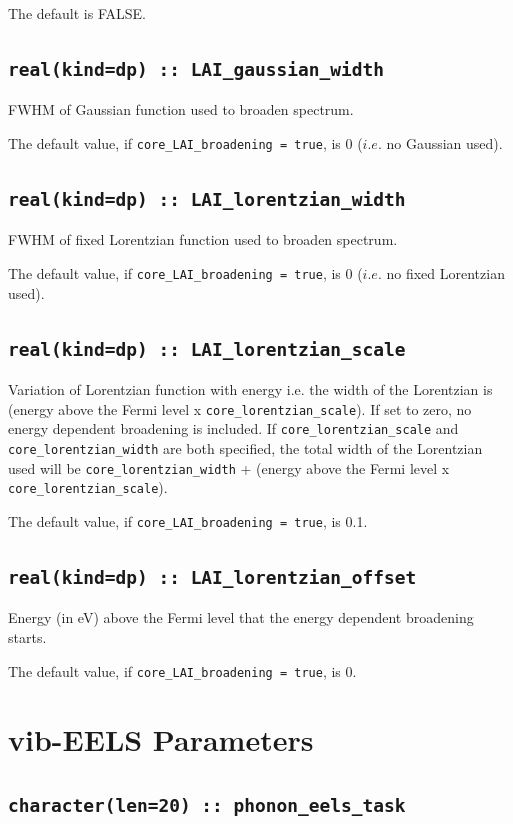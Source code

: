 \documentclass[a4paper,11pt,twoside]{book}
\begin{document}
{The default is FALSE.

\subsection[core\_gaussian\_width]{\tt real(kind=dp) :: LAI\_gaussian\_width}
FWHM of Gaussian function used to broaden spectrum.

The default value, if \verb#core_LAI_broadening = true#, is 0 ($i.e.$ no Gaussian used).

\subsection[core\_lorentzian\_width]{\tt real(kind=dp) :: LAI\_lorentzian\_width}
FWHM of fixed Lorentzian function used to broaden spectrum.

The default value, if \verb#core_LAI_broadening = true#, is 0 ($i.e.$ no fixed Lorentzian used).

\subsection[core\_lorentzian\_scale]{\tt real(kind=dp) :: LAI\_lorentzian\_scale}
Variation of Lorentzian function with energy i.e. the width of the Lorentzian is (energy above the Fermi level x
\verb#core_lorentzian_scale#).  If set to zero, no energy dependent broadening is included.
If \verb#core_lorentzian_scale# and \verb#core_lorentzian_width# are both specified, the
total width of the Lorentzian used will be \verb#core_lorentzian_width# + (energy above the Fermi level x
\verb#core_lorentzian_scale#).

The default value, if \verb#core_LAI_broadening = true#, is 0.1.

\subsection[core\_lorentzian\_offset]{\tt real(kind=dp) :: LAI\_lorentzian\_offset}
Energy (in eV) above the Fermi level that the energy dependent broadening starts.

The default value, if \verb#core_LAI_broadening = true#, is 0.

\section{vib-EELS Parameters}

\subsection[phonon\_eels\_task]{\tt character(len=20) :: phonon\_eels\_task}

}
\end{document}
